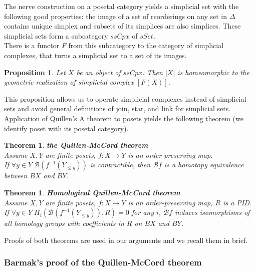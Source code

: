 \documentclass[english,12pt]{article}
\newcounter{stmcounter}[section]
\newcounter{thcounter}
\numberwithin{equation}{section}
\newtheorem{proposition}[stmcounter]{Proposition}
\newtheorem{theorem}[thcounter]{Theorem}
\theoremstyle{definition}
\theoremstyle{remark}
\begin{document}
The nerve construction on a posetal category yields a simplicial set with the following good properties: the image of a set of reorderings on any set in $\Delta$ contains unique simplex and subsets of its simplices are also simplices. These simplicial sets form a subcategory $ssCpx$ of $sSet$.\\

There is a functor $F$ from this subcategory to the category of simplicial complexes, that turns a simplicial set to a set of its images.\\

\begin{proposition}
  Let $X$ be an object of $ssCpx$. Then $|X|$ is homeomorphic to the geometric realization of simplicial complex $[F(X)]$.
\end{proposition}

This proposition allows us to operate simplicial complexes instead of simplicial sets and avoid general definitions of join, star, and link for simplicial sets.\\

Application of Quillen's A theorem to posets yields the following theorem (we identify poset with its posetal category).

\begin{theorem} \textbf{the Quillen-McCord theorem}\\
  Assume $X, Y$ are finite posets, $f : X \to Y$ is an order-preserving map.\\
  If $\forall y \in Y\;\mathcal{B}(f^{-1}(Y_{\leqslant y}))$ is contractible, then $\mathcal{B}f$ is a homotopy equivalence between $BX$ and $BY$.\\
\end{theorem}

\begin{theorem} \textbf{Homological Quillen-McCord theorem} {\cite[Corollary 5.5]{Bar11}}\\
  Assume $X, Y$ are finite posets, $f : X \to Y$ is an order-preserving map, $R$ is a PID.\\
  If $\forall y \in Y\;H_i(\mathcal{B}(f^{-1}(Y_{\leqslant y})),R) = 0$ for any $i$, $\mathcal{B}f$ induces isomorphisms of all homology groups with coefficients in $R$ on $BX$ and $BY$.\\
\end{theorem}

Proofs of both theorems are used in our arguments and we recall them in brief.

\subsubsection{Barmak's proof of the Quillen-McCord theorem}
\end{document}
